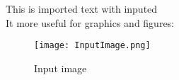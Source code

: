 This is imported text with inputed\\
It more useful for graphics and figures:
\begin{figure}[h]
    \centering
    \texttt{[image: InputImage.png]}
    \caption{Input image }
    \label{fig:InputImage}
\end{figure}

